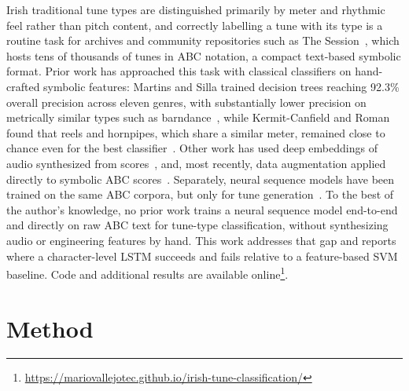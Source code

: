 \documentclass{article}
\begin{document}
Irish traditional tune types are distinguished primarily by meter and rhythmic feel rather than pitch content, and correctly labelling a tune with its type is a routine task for archives and community repositories such as The Session~\cite{TheSession}, which hosts tens of thousands of tunes in ABC notation, a compact text-based symbolic format. Prior work has approached this task with classical classifiers on hand-crafted symbolic features: Martins and Silla trained decision trees reaching 92.3\% overall precision across eleven genres, with substantially lower precision on metrically similar types such as barndance~\cite{Martins2015}, while Kermit-Canfield and Roman found that reels and hornpipes, which share a similar meter, remained close to chance even for the best classifier~\cite{Kermit2015}. Other work has used deep embeddings of audio synthesized from scores~\cite{Jimenez2024}, and, most recently, data augmentation applied directly to symbolic ABC scores~\cite{Navarro2025}. Separately, neural sequence models have been trained on the same ABC corpora, but only for tune generation~\cite{Sturm2015,Wu2023}. To the best of the author's knowledge, no prior work trains a neural sequence model end-to-end and directly on raw ABC text for tune-type classification, without synthesizing audio or engineering features by hand. This work addresses that gap and reports where a character-level LSTM succeeds and fails relative to a feature-based SVM baseline. Code and additional results are available online\footnote{\url{https://mariovallejotec.github.io/irish-tune-classification/}}.

\section{Method}\label{sec:method}
\end{document}
